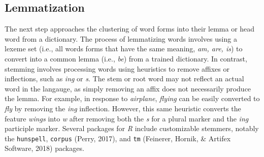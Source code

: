 \documentclass[man]{apa6}
\newenvironment{Shaded}{\begin{snugshade}}{\end{snugshade}}
\newcommand{\CommentTok}[1]{\textcolor[rgb]{0.56,0.35,0.01}{\textit{#1}}}
\newcommand{\ControlFlowTok}[1]{\textcolor[rgb]{0.13,0.29,0.53}{\textbf{#1}}}
\newcommand{\DecValTok}[1]{\textcolor[rgb]{0.00,0.00,0.81}{#1}}
\newcommand{\KeywordTok}[1]{\textcolor[rgb]{0.13,0.29,0.53}{\textbf{#1}}}
\newcommand{\NormalTok}[1]{#1}
\newcommand{\OperatorTok}[1]{\textcolor[rgb]{0.81,0.36,0.00}{\textbf{#1}}}
\newcommand{\StringTok}[1]{\textcolor[rgb]{0.31,0.60,0.02}{#1}}
\begin{document}
\scriptsize

\begin{Shaded}
\end{Shaded}

\normalsize

\hypertarget{lemmatization}{%
\subsection{Lemmatization}\label{lemmatization}}

The next step approaches the clustering of word forms into their lemma or head word from a dictionary. The process of lemmatizing words involves using a lexeme set (i.e., all words forms that have the same meaning, \emph{am, are, is}) to convert into a common lemma (i.e., \emph{be}) from a trained dictionary. In contrast, stemming involves processing words using heuristics to remove affixes or inflections, such as \emph{ing} or \emph{s}. The stem or root word may not reflect an actual word in the langauge, as simply removing an affix does not necessarily produce the lemma. For example, in response to \emph{airplane}, \emph{flying} can be easily converted to \emph{fly} by removing the \emph{ing} inflection. However, this same heuristic converts the feature \emph{wings} into \emph{w} after removing both the \emph{s} for a plural marker and the \emph{ing} participle marker. Several packages for \emph{R} include customizable stemmers, notably the \texttt{hunspell}, \texttt{corpus} (Perry, 2017), and \texttt{tm} (Feinerer, Hornik, \& Artifex Software, 2018) packages.
\end{document}
